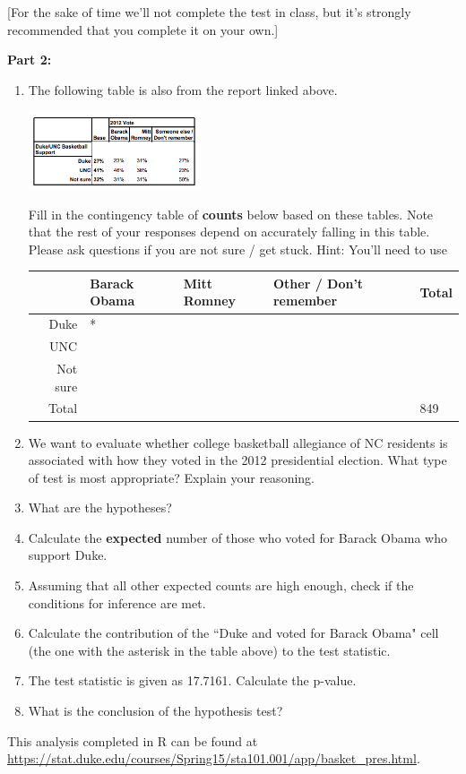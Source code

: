 \documentclass[11pt]{article}
\begin{document}
[For the sake of time we'll not complete the test in class, but it's strongly recommended that you complete it on your own.]

\textbf{Part 2:}

\begin{enumerate}[resume]

\item The following table is also from the report linked above. 

\begin{center}
\includegraphics[width=0.4\textwidth]{pp_basket_pres}
\end{center}

Fill in the contingency table of \textbf{counts} below based on these tables. Note that the rest of your responses depend on accurately falling in this table. Please ask questions if you are not sure / get stuck. Hint: You'll need to use

\begin{center}
\begin{tabular}{r | l | l | l | l}
				& Barack Obama	& Mitt Romney	& Other / Don't remember	& Total \\
\hline
\hline
Duke			& *				& 			&					&  \\
\hline
UNC				& 				& 			& 					&  \\
\hline
Not sure			& 				& 			& 					&  \\
\hline
\hline
Total				& 				& 			& 					& 849 \\
\end{tabular}
\end{center}

\item We want to evaluate whether college basketball allegiance of NC residents is associated with how they voted in the 2012 presidential election. What type of test is most appropriate? Explain your reasoning.

\item What are the hypotheses?

\item Calculate the \textbf{expected} number of those who voted for Barack Obama who support Duke.

\item Assuming that all other expected counts are high enough, check if the conditions for inference are met.

\item Calculate the contribution of the ``Duke and voted for Barack Obama" cell (the one with the asterisk in the table above) to the test statistic.

\item The test statistic is given as 17.7161. Calculate the p-value.

\item What is the conclusion of the hypothesis test?

\end{enumerate}

This analysis completed in R can be found at \url{https://stat.duke.edu/courses/Spring15/sta101.001/app/basket_pres.html}.

%
\end{document}
